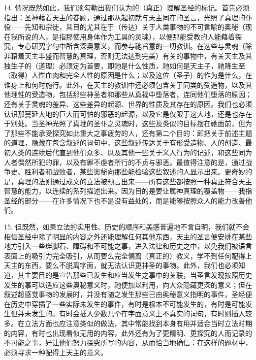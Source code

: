 14. 情况既然如此，我们须勾勒出我们认为的（真正）理解圣经的标记。首先必须指出：圣神藉着天主的眷顾，通过那从起初就与天主同在的圣言，光照了真理的仆役——先知和宗徒，其目的尤其在于（传达）关于人类事物的不可言喻的奥秘（现在我所说的人，是指那使用身体作为工具的灵魂），以便那能受教的人能藉着探究，专心研究字句中所含深奥意义，而参与祂旨意的一切教训。在这些与灵魂（除非藉着天主丰盛而智慧的真理，否则无法达到完美）有关的事物中，有关天主及其独生子的（道理）必须定为首要，即祂是什么性质，祂如何是天主子，祂降生至（取得）人性血肉和完全人性的原因是什么；以及这位（圣子）的作为是什么，在谁身上和何时施行。此外，在天主的教训中还必须包含关于同类的受造物，以及其他理性的受造物，包括那些神圣者和那些从真福中堕落者，连同他们堕落的原因；还有关于灵魂的差异、这些差异的起源、世界的性质及其存在的原因。我们也必须认识那蔓延大地的巨大而可怕的邪恶的起源，以及它是仅限于这大地，还是也存在于别处。当圣神光照了真理的圣仆之灵魂时，这些及类似的目标摆在祂面前，但为了那些不能承受探究如此重大之事疲劳的人，还有第二个目的：即把关于前述主题的道理，隐藏在包含叙述的词句中，这些叙述传达关于有形受造物、人的创造、最初人类的连续后代直到他们众多、以及其他一些关于义人行为的记述，和这些同为人者偶然所犯的罪，以及有罪不虔者所行的不贞与邪恶。最值得注意的是，通过战争史、胜利者和战败者，某些奥秘向那些能检验这些叙述的人显示出来。更奇妙的是，真理的法则通过成文的立法被预言出来——所有这些都按照一种真正符合天主智慧的能力，以连续的系列描述出来。因为目的是要让属神真理的覆盖物——我指圣经的部分——在许多情况下也不是没有益处的，而是能够按照众人的能力改善他们。\par

15. 但既然，如果立法的实用性、历史的顺序和美感普遍地不言自明，我们就不会相信圣经中除了明显的内容之外还能理解任何其他东西，天主的圣言便安排在某些地方引入一些绊脚石、障碍和不可能之事，进入法律和历史之中，以免我们被语言表面上的吸引力完全吸引，从而要么完全偏离（真正的）教义，学不到任何配得上天主的东西，要么不脱离字面，就无法认识更神圣的事物。此外，我们也必须知道，其主要目的是宣告那些已发生和应当发生之事中的关联，当圣言发现按照历史发生的事可以适应这些奥秘意义时，祂便加以利用，向大众隐藏更深的意义；但在叙述超感觉事物的发展时，并没有随之发生那些已由奥秘意义指明的事件，圣经便在历史中穿插了一些实际未发生的事件，有时是根本不可能发生的，有时是可能发生但并未发生的。有时会插入少数几个在字面意义上不真实的词句，有时则插入较多。在立法方面也应注意类似的做法，其中常能找到本身有用并适合当时立法时期的内容，有时也出现看似无用的内容，此外还有为了更精明、更探究的人而记录的不可能之事，好让他们努力探究所写的内容，从而恰当地确信：在这样的题材中，必须寻求一种配得上天主的意义。\par

